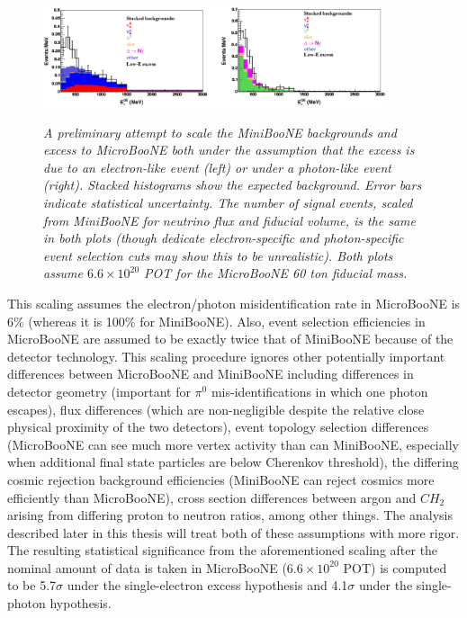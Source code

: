 \begin{figure}[ht!]
\centering
	\includegraphics[width=0.9\textwidth]{Figures/TDR_LEE_scaling.png} \\
\caption{\textit{A preliminary attempt to scale the MiniBooNE backgrounds and excess to MicroBooNE both under the assumption that the excess is due to an electron-like event (left) or under a photon-like event (right). Stacked histograms show the expected background. Error bars indicate statistical uncertainty. The number of signal events, scaled from MiniBooNE for neutrino flux and fiducial volume, is the same in both plots (though dedicate electron-specific and photon-specific event selection cuts may show this to be unrealistic). Both plots assume $6.6 \times 10^20$ POT for the MicroBooNE 60 ton fiducial mass.}}\label{TDR_LEE_scaling_fig}
\end{figure}


This scaling assumes the electron/photon misidentification rate in MicroBooNE is 6\% (whereas it is 100\% for MiniBooNE). Also, event selection efficiencies in MicroBooNE are assumed to be exactly twice that of MiniBooNE because of the detector technology. This scaling procedure ignores other potentially important differences between MicroBooNE and MiniBooNE including differences in detector geometry (important for $\pi^0$ mis-identifications in which one photon escapes), flux differences (which are non-negligible despite the relative close physical proximity of the two detectors), event topology selection differences (MicroBooNE can see much more vertex activity than can MiniBooNE, especially when additional final state particles are below Cherenkov threshold), the differing cosmic rejection background efficiencies (MiniBooNE can reject cosmics more efficiently than MicroBooNE), cross section differences between argon and $CH_2$ arising from differing proton to neutron ratios, among other things. The analysis described later in this thesis will treat both of these assumptions with more rigor.\\

The resulting statistical significance from the aforementioned scaling after the nominal amount of data is taken in MicroBooNE ($6.6\times 10^{20}$ POT) is computed to be 5.7$\sigma$ under the single-electron excess hypothesis and 4.1$\sigma$ under the single-photon hypothesis. \\

